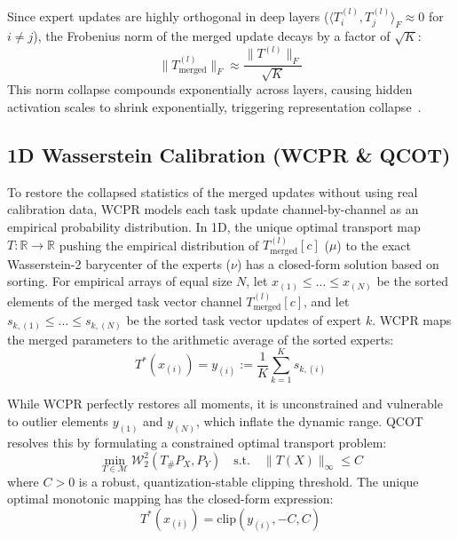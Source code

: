 \documentclass{article}
\theoremstyle{plain}
\theoremstyle{definition}
\theoremstyle{remark}
\begin{document}
Since expert updates are highly orthogonal in deep layers ($\langle T^{(l)}_i, T^{(l)}_j \rangle_F \approx 0$ for $i \neq j$), the Frobenius norm of the merged update decays by a factor of $\sqrt{K}$:
\begin{equation}
\|T^{(l)}_{\text{merged}}\|_F \approx \frac{\|T^{(l)}\|_F}{\sqrt{K}}
\end{equation}
This norm collapse compounds exponentially across layers, causing hidden activation scales to shrink exponentially, triggering representation collapse~\cite{jordan2023repair}.

\subsection{1D Wasserstein Calibration (WCPR \& QCOT)}

To restore the collapsed statistics of the merged updates without using real calibration data, WCPR models each task update channel-by-channel as an empirical probability distribution. In 1D, the unique optimal transport map $T : \mathbb{R} \to \mathbb{R}$ pushing the empirical distribution of $T^{(l)}_{\text{merged}}[c]$ ($\mu$) to the exact Wasserstein-2 barycenter of the experts ($\nu$) has a closed-form solution based on sorting. For empirical arrays of equal size $N$, let $x_{(1)} \le \dots \le x_{(N)}$ be the sorted elements of the merged task vector channel $T^{(l)}_{\text{merged}}[c]$, and let $s_{k, (1)} \le \dots \le s_{k, (N)}$ be the sorted task vector updates of expert $k$. WCPR maps the merged parameters to the arithmetic average of the sorted experts:
\begin{equation}
T^*(x_{(i)}) = y_{(i)} := \frac{1}{K} \sum_{k=1}^K s_{k, (i)}
\end{equation}

While WCPR perfectly restores all moments, it is unconstrained and vulnerable to outlier elements $y_{(1)}$ and $y_{(N)}$, which inflate the dynamic range. QCOT resolves this by formulating a constrained optimal transport problem:
\begin{equation}
\min_{T \in \mathcal{M}} \mathcal{W}_2^2(T_\# P_X, P_Y) \quad \text{s.t.} \quad \|T(X)\|_\infty \le C
\end{equation}
where $C > 0$ is a robust, quantization-stable clipping threshold. The unique optimal monotonic mapping has the closed-form expression:
\begin{equation}
T^*(x_{(i)}) = \text{clip}(y_{(i)}, -C, C)
\end{equation}
\end{document}
